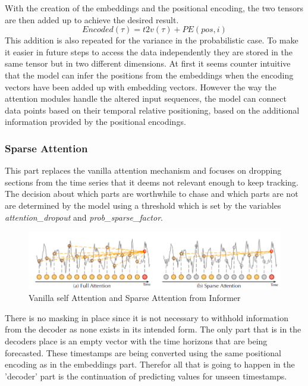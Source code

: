 \documentclass{article}
\begin{document}
With the creation of the embeddings and the positional encoding, the two tensors are then added up to achieve the desired result.
\begin{equation}
    Encoded(\tau) = t2v(\tau) + PE(pos,i)
\end{equation}
This addition is also repeated for the variance in the probabilistic case. To make it easier in future steps to access the data independently they are stored in the same tensor but in two different dimensions.
At first it seems counter intuitive that the model can infer the positions from the embeddings when the encoding vectors have been added up with embedding vectors. However the way the attention modules handle the altered input sequences, the model can connect data points based on their temporal relative positioning, based on the additional information provided by the positional encodings.

\subsubsection{Sparse Attention}

This part replaces the vanilla attention mechanism and focuses on dropping sections from the time series that it deems not relevant enough to keep tracking. The decision about which parts are worthwhile to chase and which parts are not are determined by the model using a threshold which is set by the variables \textit{attention\_dropout} and \textit{prob\_sparse\_factor}.

\begin{figure}[!ht]
    \centering
    \includegraphics[width=\linewidth]{graphs/Sparse_Attention_Example.png}
    \caption{Vanilla self Attention and Sparse Attention from Informer}
    \label{fig:sparse_attention}
\end{figure}

There is no masking in place since it is not necessary to withhold information from the decoder as none exists in its intended form. The only part that is in the decoders place is an empty vector with the time horizons that are being forecasted. These timestamps are being converted using the same positional encoding as in the embeddings part. Therefor all that is going to happen in the 'decoder' part is the continuation of predicting values for unseen timestamps.
\end{document}
